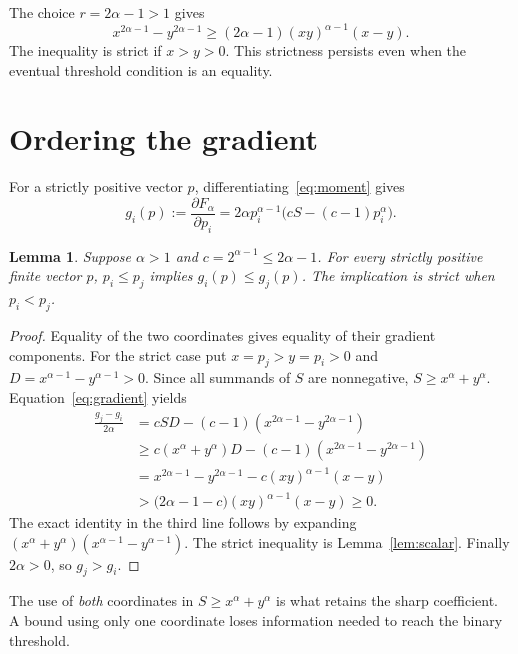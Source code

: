 \documentclass[11pt,a4paper]{article}
\newtheorem{lemma}[theorem]{Lemma}
\begin{document}
The choice $r=2\alpha-1>1$ gives
\begin{equation}\label{eq:alpha-scalar}
x^{2\alpha-1}-y^{2\alpha-1}
\ge(2\alpha-1)(xy)^{\alpha-1}(x-y).
\end{equation}
The inequality is strict if $x>y>0$. This strictness persists even when the
eventual threshold condition is an equality.

\section{Ordering the gradient}

For a strictly positive vector $p$, differentiating~\eqref{eq:moment} gives
\begin{equation}\label{eq:gradient}
g_i(p):=\frac{\partial F_\alpha}{\partial p_i}
=2\alpha p_i^{\alpha-1}\bigl(cS-(c-1)p_i^\alpha\bigr).
\end{equation}

\begin{lemma}\label{lem:gradient}
Suppose $\alpha>1$ and $c=2^{\alpha-1}\le2\alpha-1$.
For every strictly positive finite vector $p$,
$p_i\le p_j$ implies $g_i(p)\le g_j(p)$. The implication is strict when
$p_i<p_j$.
\end{lemma}

\begin{proof}
Equality of the two coordinates gives equality of their gradient components.
For the strict case put $x=p_j>y=p_i>0$ and
$D=x^{\alpha-1}-y^{\alpha-1}>0$.
Since all summands of $S$ are nonnegative, $S\ge x^\alpha+y^\alpha$.
Equation~\eqref{eq:gradient} yields
\begin{align*}
\frac{g_j-g_i}{2\alpha}
&=cSD-(c-1)(x^{2\alpha-1}-y^{2\alpha-1})\\
&\ge c(x^\alpha+y^\alpha)D
  -(c-1)(x^{2\alpha-1}-y^{2\alpha-1})\\
&=x^{2\alpha-1}-y^{2\alpha-1}
  -c(xy)^{\alpha-1}(x-y)\\
&>\bigl(2\alpha-1-c\bigr)(xy)^{\alpha-1}(x-y)\ge0.
\end{align*}
The exact identity in the third line follows by expanding
$(x^\alpha+y^\alpha)(x^{\alpha-1}-y^{\alpha-1})$.
The strict inequality is Lemma~\ref{lem:scalar}.
Finally $2\alpha>0$, so $g_j>g_i$.
\end{proof}

The use of \emph{both} coordinates in $S\ge x^\alpha+y^\alpha$ is what
retains the sharp coefficient. A bound using only one coordinate loses
information needed to reach the binary threshold.
\end{document}
